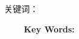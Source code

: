 \documentclass[a4paper,12pt,openany,twoside]{book}
\begin{document}
\begin{sloppypar}
\begin{CJK*}{UTF8}{song}

\begin{center}%
{
\vspace*{11pt}
 \hei{}}
\vspace{7pt}

 \end{center}
\thispagestyle{cchair}
\pagestyle{cchair}

\song\xiaosi\setlength{\baselineskip}{20pt}
\setlength\parindent{2em}\@cabstract
\vspace{\baselineskip}


{{\hei\xiaosi 关键词：} \@ckeywords}


\clearpage
\begin{center}%
{
\vspace*{-4pt}
\sanhao\bf {}}
\vspace*{1.45pt}

 \end{center}
\thispagestyle{echair}
\pagestyle{echair}
\newcommand{\enabstractname}{Abstract}
\setlength{\baselineskip}{20pt}\setlength\parindent{1em}\@eabstract
\vspace{\baselineskip}
\noindent
{{\xiaosi\textbf{~~~~Key Words:}} \@ekeywords}



\clearpage
\newcommand{\loflabel}{图~}
\renewcommand{\numberline}[1]{\song\xiaosi\loflabel~#1\hspace*{\baselineskip}}


\end{CJK*}
\end{sloppypar}
\end{document}
